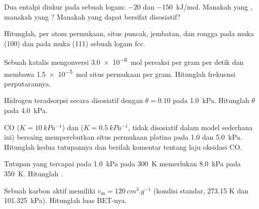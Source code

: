 \begin{exercise}[$\star$]\label{exo:b3:surfaces-catalysis:2}
Dua entalpi  diukur pada sebuah logam: $-20$ dan \qty{-150}{kJ/mol}. Manakah
yang , manakah yang ? Manakah yang dapat bersifat disosiatif?
\end{exercise}

\begin{exercise}[$\star$]\label{exo:b3:surfaces-catalysis:3}
Hitunglah, per atom permukaan, situs puncak, jembatan, dan rongga pada muka (100) dan pada
muka (111) sebuah logam fcc.
\end{exercise}

\begin{exercise}[$\star$]\label{exo:b3:surfaces-catalysis:4}
Sebuah katalis mengonversi \qty{3.0e-6}{mol} pereaksi per gram per detik dan membawa
\qty{1.5e-5}{mol} situs permukaan per gram. Hitunglah frekuensi perputarannya.
\end{exercise}

\begin{exercise}[$\star\star$]\label{exo:b3:surfaces-catalysis:5}
Hidrogen teradsorpsi secara disosiatif dengan $\theta = 0.10$ pada \qty{1.0}{kPa}. Hitunglah $\theta$ pada \qty{4.0}{kPa}.
\end{exercise}

\begin{exercise}[$\star\star$]\label{exo:b3:surfaces-catalysis:6}
CO ($K = \qty{10}{kPa^{-1}}$) dan  ($K = \qty{0.5}{kPa^{-1}}$, tidak disosiatif dalam model sederhana ini)
bersaing memperebutkan situs permukaan platina pada 1.0 dan \qty{5.0}{kPa}. Hitunglah kedua
tutupannya dan berilah komentar tentang laju oksidasi CO.
\end{exercise}

\begin{exercise}[$\star\star$]\label{exo:b3:surfaces-catalysis:7}
Tutupan yang tercapai pada \qty{1.0}{kPa} pada \qty{300}{K} memerlukan \qty{8.0}{kPa} pada \qty{350}{K}. Hitunglah .
\end{exercise}

\begin{exercise}[$\star\star$]\label{exo:b3:surfaces-catalysis:8}
Sebuah karbon aktif memiliki $v_{\mathrm m} = \qty{120}{cm^3.g^{-1}}$ (kondisi standar, 273.15 K dan
\qty{101.325}{kPa}). Hitunglah luas BET-nya.
\end{exercise}

